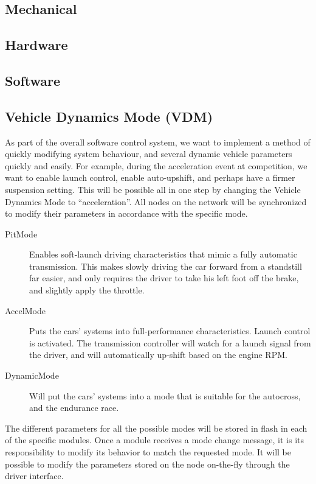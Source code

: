 \subsection{Mechanical}
\subsection{Hardware}
\subsection{Software}

\subsection{Vehicle Dynamics Mode (VDM)}

As part of the overall software control system, we want to implement a method of quickly modifying system behaviour, and several dynamic vehicle parameters quickly and easily. For example, during the acceleration event at competition, we want to enable launch control, enable auto-upshift, and perhaps have a firmer suspension setting. This will be possible all in one step by changing the Vehicle Dynamics Mode to {}``acceleration''. All nodes on the network will be synchronized to modify their parameters in accordance with the specific mode.
\begin{description}
  \item [{PitMode}] Enables soft-launch driving characteristics that mimic a fully automatic transmission. This makes slowly driving the car forward from a standstill far easier, and only requires the driver to take his left foot off the brake, and slightly apply the throttle.
  \item [{AccelMode}] Puts the cars' systems into full-performance characteristics. Launch control is activated. The transmission controller will watch for a launch signal from the driver, and will automatically up-shift based on the engine RPM.
  \item [{DynamicMode}] Will put the cars' systems into a mode that is suitable for the autocross, and the endurance race.
\end{description}
The different parameters for all the possible modes will be stored in flash in each of the specific modules. Once a module receives a mode change message, it is its responsibility to modify its behavior to match the requested mode. It will be possible to modify the parameters stored on the node on-the-fly through the driver interface.

